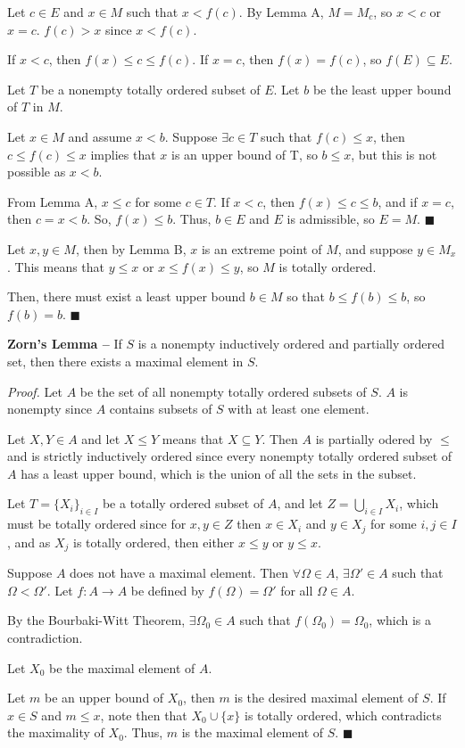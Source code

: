 \documentclass{article}
\begin{document}
Let $c \in E$ and $x \in M$ such that $x < f(c)$. By Lemma A, $M = M_c$, so $x < c$ or $x = c$. $f(c) > x$ since $x < f(c)$. 

If $x < c$, then $f(x) \leq c \leq f(c)$. If $x = c$, then $f(x) = f(c)$, so $f(E) \subseteq E$.

Let $T$ be a nonempty totally ordered subset of $E$. Let $b$ be the least upper bound of $T$ in $M$.

Let $x \in M$ and assume $x < b$. Suppose $\exists c \in T$ such that $f(c) \leq x$, then $c \leq f(c) \leq x$ implies that $x$ is an upper bound of T, so $b \leq x$, but this is not possible as $x < b$.

From Lemma A, $x \leq c$ for some $c \in T$. If $x < c$, then $f(x) \leq c \leq b$, and if $x = c$, then $c = x < b$. So, $f(x) \leq b$. Thus, $b \in E$ and $E$ is admissible, so $E = M$. $\blacksquare$

Let $x, y \in M$, then by Lemma B, $x$ is an extreme point of $M$, and suppose $y \in M_x$. This means that $y \leq x$ or $x \leq f(x) \leq y$, so $M$ is totally ordered.

Then, there must exist a least upper bound $b \in M$ so that $b \leq f(b) \leq b$, so $f(b) = b$. $\blacksquare$

\textbf{Zorn's Lemma --} If $S$ is a nonempty inductively ordered and partially ordered set, then there exists a maximal element in $S$.

\textit{Proof.} Let $A$ be the set of all nonempty totally ordered subsets of $S$. $A$ is nonempty since $A$ contains subsets of $S$ with at least one element.

Let $X, Y \in A$ and let $X \leq Y$ means that $X \subseteq Y$. Then $A$ is partially odered by $\leq$ and is strictly inductively ordered since every nonempty totally ordered subset of $A$ has a least upper bound, which is the union of all the sets in the subset.

Let $T = \{X_i\}_{i \in I}$ be a totally ordered subset of $A$, and let $Z = \bigcup_{i \in I}{X_i}$, which must be totally ordered since for $x, y \in Z$ then $x \in X_i$ and $y \in X_j$ for some $i, j \in I$, and as $X_j$ is totally ordered, then either $x \leq y$ or $y \leq x$.

Suppose $A$ does not have a maximal element. Then $\forall \Omega \in A$, $\exists \Omega' \in A$ such that $\Omega < \Omega'$. Let $f: A \to A$ be defined by $f(\Omega) = \Omega'$ for all $\Omega \in A$.

By the Bourbaki-Witt Theorem, $\exists \Omega_0 \in A$ such that $f(\Omega_0) = \Omega_0$, which is a contradiction.

Let $X_0$ be the maximal element of $A$.

Let $m$ be an upper bound of $X_0$, then $m$ is the desired maximal element of $S$. If $x \in S$ and $m \leq x$, note then that $X_0 \cup \{x\}$ is totally ordered, which contradicts the maximality of $X_0$. Thus, $m$ is the maximal element of $S$. $\blacksquare$
\end{document}
